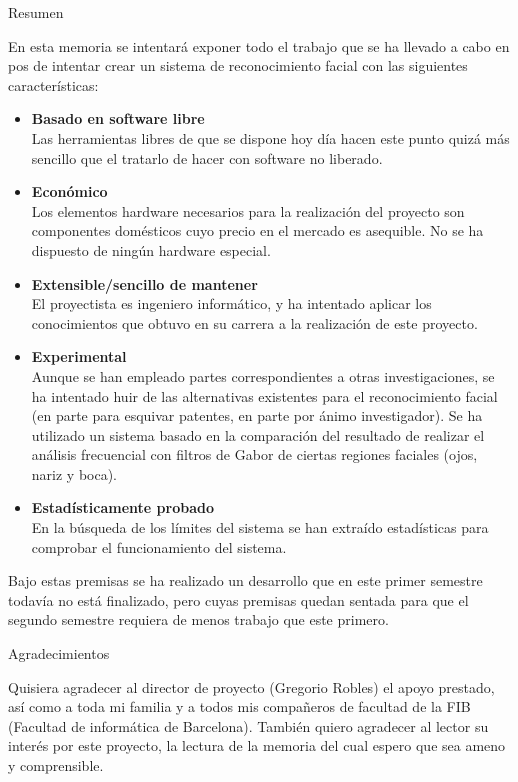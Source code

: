 \begin{center}
\Huge{Resumen}\\
\end{center}

En esta memoria se intentará exponer todo el trabajo que se ha llevado a cabo en pos de intentar crear un sistema de reconocimiento facial con las siguientes características:
\begin{itemize}
	\item{\textbf{Basado en software libre}\\
	Las herramientas libres de que se dispone hoy día hacen este punto quizá más sencillo que el tratarlo de hacer con software no liberado.}
	\item{\textbf{Económico}\\
	Los elementos hardware necesarios para la realización del proyecto son componentes domésticos cuyo precio en el mercado es asequible. No se ha dispuesto de ningún hardware especial. }
	\item{\textbf{Extensible/sencillo de mantener}\\
	El proyectista es ingeniero informático, y ha intentado aplicar los conocimientos que obtuvo en su carrera a la realización de este proyecto.}
	\item{\textbf{Experimental}\\
	Aunque se han empleado partes correspondientes a otras investigaciones, se ha intentado huir de las alternativas existentes para el reconocimiento facial (en parte para esquivar patentes, en parte por ánimo investigador). Se ha utilizado un sistema basado en la comparación del resultado de realizar el análisis frecuencial con filtros de Gabor de ciertas regiones faciales (ojos, nariz y boca).}
	\item{\textbf{Estadísticamente probado}\\
	En la búsqueda de los límites del sistema se han extraído estadísticas para comprobar el funcionamiento del sistema.}
\end{itemize}
Bajo estas premisas se ha realizado un desarrollo que en este primer semestre todavía no está finalizado, pero cuyas premisas quedan sentada para que el segundo semestre requiera de menos trabajo que este primero.\\[2cm]

\begin{center}
\Large{Agradecimientos}
\end{center}

Quisiera agradecer al director de proyecto (Gregorio Robles) el apoyo prestado, así como a toda mi familia y a todos mis compañeros de facultad de la FIB (Facultad de informática de Barcelona). También quiero agradecer al lector su interés por este proyecto, la lectura de la memoria del cual espero que sea ameno y comprensible. \\

